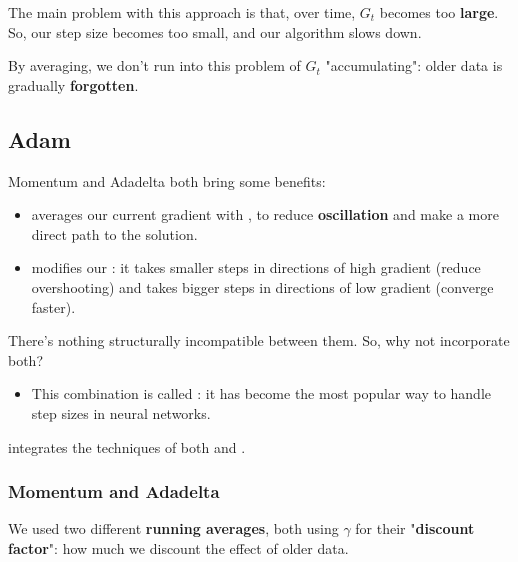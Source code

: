             The main problem with this approach is that, over time, $G_t$ becomes too \textbf{large}. So, our step size becomes too small, and our algorithm slows down.

            By averaging, we don't run into this problem of $G_t$ "accumulating": older data is gradually \textbf{forgotten}.

    \pagebreak
    \subsection{Adam}

        Momentum and Adadelta both bring some benefits:

        \begin{itemize}
            \item {} averages our current gradient with , to reduce \textbf{oscillation} and make a more direct path to the solution.
            
            \item {} modifies our : it takes smaller steps in directions of high gradient (reduce overshooting) and takes bigger steps in directions of low gradient (converge faster).
        \end{itemize}

        There's nothing structurally incompatible between them. So, why not incorporate both?

        \begin{itemize}
            \item This combination is called : it has become the most popular way to handle step sizes in neural networks.\\
        \end{itemize}

        \begin{concept}
             integrates the techniques of both  and .
        \end{concept}

        \subsecdiv

        \subsubsection{Momentum and Adadelta}

            We used two different \textbf{running averages}, both using $\gamma$ for their "\textbf{discount factor}": how much we discount the effect of older data.
    
